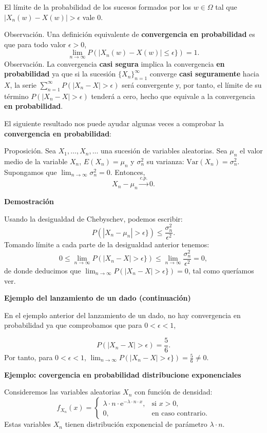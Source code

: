 \documentclass[
  letterpaper,
  DIV=11,
  numbers=noendperiod]{scrreprt}
\begin{document}
El límite de la probabilidad de los sucesos formados por los
\(w\in\Omega\) tal que \(|X_n(w)-X(w)|>\epsilon\) vale 0.

Observación. Una definición equivalente de \textbf{convergencia en
probabilidad} es que para todo valor \(\epsilon >0\), \[
\lim_{n\to\infty} P(|X_n(w)-X(w)|\leq \epsilon \})=1.
\] Observación. La convergencia \textbf{casi segura} implica la
convergencia \textbf{en probabilidad} ya que si la sucesión
\(\{X_n\}_{n=1}^\infty\) converge \textbf{casi seguramente} hacia \(X\),
la serie \(\sum_{n=1}^\infty P(|X_n-X|>\epsilon)\) será convergente y,
por tanto, el límite de su término \(P(|X_n-X|>\epsilon)\) tenderá a
cero, hecho que equivale a la convergencia \textbf{en probabilidad}.

El siguiente resultado nos puede ayudar algunas veces a comprobar la
\textbf{convergencia en probabilidad}:

Proposición. Sea \(X_1,\ldots,X_n,\ldots\) una sucesión de variables
aleatorias. Sea \(\mu_n\) el valor medio de la variable \(X_n\),
\(E(X_n)=\mu_n\) y \(\sigma_n^2\) su varianza:
\(\mathrm{Var}(X_n)=\sigma_n^2\). Supongamos que
\(\lim_{n\to\infty}\sigma_n^2=0\). Entonces, \[
X_n-\mu_n\stackrel{c.p.}{\longrightarrow} 0.
\]

\textbf{Demostración}

Usando la desigualdad de Chebyschev, podemos escribir: \[
P(|X_n-\mu_n|>\epsilon \}) \leq \frac{\sigma_n^2}{\epsilon^2}.
\] Tomando límite a cada parte de la desigualdad anterior tenemos: \[
0\leq \lim_{n\to\infty} P(|X_n-X|>\epsilon \}) \leq \lim_{n\to\infty}\frac{\sigma_n^2}{\epsilon^2}=0,
\] de donde deducimos que
\(\lim_{n\to\infty} P(|X_n-X|>\epsilon \})=0\), tal como queríamos ver.

\textbf{Ejemplo del lanzamiento de un dado (continuación)}

En el ejemplo anterior del lanzamiento de un dado, no hay convergencia
en probabilidad ya que comprobamos que para \(0<\epsilon<1\),

\[
P(|X_n-X|>\epsilon)=\frac{5}{6}.
\] Por tanto, para \(0<\epsilon<1\),
\(\lim_{n\to\infty} P(|X_n-X|>\epsilon \})=\frac{5}{6}\neq 0.\)

\textbf{Ejemplo: covergencia en probabilidad distribucione
exponenciales}

Consideremos las variables aleatorias \(X_n\) con función de densidad:
\[
f_{X_n}(x)=\begin{cases}
\lambda\cdot  n\cdot\mathrm{e}^{-\lambda\cdot n\cdot  x}, & \mbox{si }x>0,\\
0, & \mbox{en caso contrario.}
\end{cases}
\] Estas variables \(X_n\) tienen distribución exponencial de parámetro
\(\lambda\cdot n\).
\end{document}
